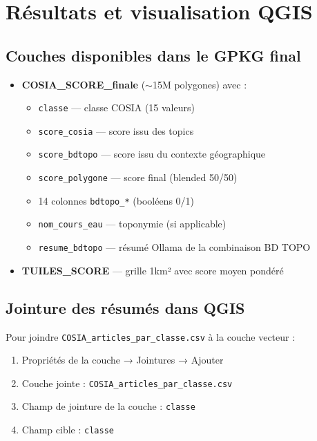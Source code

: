 \documentclass[12pt,a4paper]{report}
\newcommand{\code}[1]{\texttt{\small #1}}
\newcommand{\bdtopo}{\textsc{BD TOPO}}
\begin{document}
\section{Résultats et visualisation QGIS}

\subsection{Couches disponibles dans le GPKG final}

\begin{itemize}
  \item \textbf{COSIA\_SCORE\_finale} ($\sim$15M polygones) avec :
    \begin{itemize}
      \item \code{classe} — classe COSIA (15 valeurs)
      \item \code{score\_cosia} — score issu des topics
      \item \code{score\_bdtopo} — score issu du contexte géographique
      \item \code{score\_polygone} — score final (blended 50/50)
      \item 14 colonnes \code{bdtopo\_*} (booléens 0/1)
      \item \code{nom\_cours\_eau} — toponymie (si applicable)
      \item \code{resume\_bdtopo} — résumé Ollama de la combinaison \bdtopo{}
    \end{itemize}
  \item \textbf{TUILES\_SCORE} — grille 1km² avec score moyen pondéré
\end{itemize}

\subsection{Jointure des résumés dans QGIS}

Pour joindre \code{COSIA\_articles\_par\_classe.csv} à la couche vecteur :
\begin{enumerate}
  \item Propriétés de la couche → Jointures → Ajouter
  \item Couche jointe : \code{COSIA\_articles\_par\_classe.csv}
  \item Champ de jointure de la couche : \code{classe}
  \item Champ cible : \code{classe}
\end{enumerate}
\end{document}
